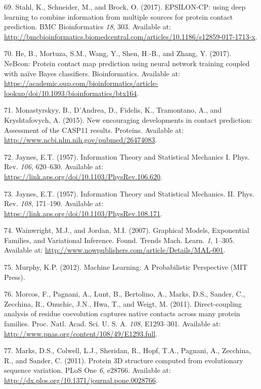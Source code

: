 \documentclass[12pt,a4paper,twoside]{book}
\theoremstyle{definition}
\theoremstyle{definition}
\theoremstyle{remark}
\begin{document}
\hypertarget{ref-Stahl2017}{}
69. Stahl, K., Schneider, M., and Brock, O. (2017). EPSILON-CP: using
deep learning to combine information from multiple sources for protein
contact prediction. BMC Bioinformatics \emph{18}, 303. Available at:
\url{http://bmcbioinformatics.biomedcentral.com/articles/10.1186/s12859-017-1713-x}.

\hypertarget{ref-He2017}{}
70. He, B., Mortuza, S.M., Wang, Y., Shen, H.-B., and Zhang, Y. (2017).
NeBcon: Protein contact map prediction using neural network training
coupled with naïve Bayes classifiers. Bioinformatics. Available at:
\url{https://academic.oup.com/bioinformatics/article-lookup/doi/10.1093/bioinformatics/btx164}.

\hypertarget{ref-Monastyrskyy2015}{}
71. Monastyrskyy, B., D'Andrea, D., Fidelis, K., Tramontano, A., and
Kryshtafovych, A. (2015). New encouraging developments in contact
prediction: Assessment of the CASP11 results. Proteins. Available at:
\url{http://www.ncbi.nlm.nih.gov/pubmed/26474083}.

\hypertarget{ref-Jaynes1957a}{}
72. Jaynes, E.T. (1957). Information Theory and Statistical Mechanics I.
Phys. Rev. \emph{106}, 620--630. Available at:
\url{https://link.aps.org/doi/10.1103/PhysRev.106.620}.

\hypertarget{ref-Jaynes1957b}{}
73. Jaynes, E.T. (1957). Information Theory and Statistical Mechanics.
II. Phys. Rev. \emph{108}, 171--190. Available at:
\url{https://link.aps.org/doi/10.1103/PhysRev.108.171}.

\hypertarget{ref-Wainwright2007}{}
74. Wainwright, M.J., and Jordan, M.I. (2007). Graphical Models,
Exponential Families, and Variational Inference. Found. Trends Mach.
Learn. \emph{1}, 1--305. Available at:
\url{http://www.nowpublishers.com/article/Details/MAL-001}.

\hypertarget{ref-Murphy2012}{}
75. Murphy, K.P. (2012). Machine Learning: A Probabilistic Perspective
(MIT Press).

\hypertarget{ref-Morcos2011}{}
76. Morcos, F., Pagnani, A., Lunt, B., Bertolino, A., Marks, D.S.,
Sander, C., Zecchina, R., Onuchic, J.N., Hwa, T., and Weigt, M. (2011).
Direct-coupling analysis of residue coevolution captures native contacts
across many protein families. Proc. Natl. Acad. Sci. U. S. A.
\emph{108}, E1293--301. Available at:
\url{http://www.pnas.org/content/108/49/E1293.full}.

\hypertarget{ref-Marks2011}{}
77. Marks, D.S., Colwell, L.J., Sheridan, R., Hopf, T.A., Pagnani, A.,
Zecchina, R., and Sander, C. (2011). Protein 3D structure computed from
evolutionary sequence variation. PLoS One \emph{6}, e28766. Available
at: \url{http://dx.plos.org/10.1371/journal.pone.0028766}.
\end{document}
